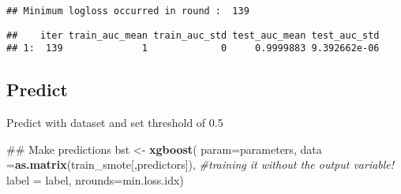\documentclass[11pt,]{article}
\newenvironment{Shaded}{\begin{snugshade}}{\end{snugshade}}
\newcommand{\KeywordTok}[1]{\textcolor[rgb]{0.13,0.29,0.53}{\textbf{#1}}}
\newcommand{\DataTypeTok}[1]{\textcolor[rgb]{0.13,0.29,0.53}{#1}}
\newcommand{\CharTok}[1]{\textcolor[rgb]{0.31,0.60,0.02}{#1}}
\newcommand{\StringTok}[1]{\textcolor[rgb]{0.31,0.60,0.02}{#1}}
\newcommand{\CommentTok}[1]{\textcolor[rgb]{0.56,0.35,0.01}{\textit{#1}}}
\newcommand{\OperatorTok}[1]{\textcolor[rgb]{0.81,0.36,0.00}{\textbf{#1}}}
\newcommand{\NormalTok}[1]{#1}
\begin{document}
\begin{Shaded}
\end{Shaded}

\begin{verbatim}
## Minimum logloss occurred in round :  139
\end{verbatim}

\begin{Shaded}
\end{Shaded}

\begin{verbatim}
##    iter train_auc_mean train_auc_std test_auc_mean test_auc_std
## 1:  139              1             0     0.9999883 9.392662e-06
\end{verbatim}

\subsection{Predict}\label{predict}

Predict with dataset and set threshold of 0.5

\begin{Shaded}
\begin{Highlighting}[]
\NormalTok{## Make predictions}
\NormalTok{bst <-}\StringTok{ }\KeywordTok{xgboost}\NormalTok{(}
  \DataTypeTok{param=}\NormalTok{parameters,}
  \DataTypeTok{data =}\KeywordTok{as.matrix}\NormalTok{(train_smote[,predictors]), }\CommentTok{#training it without the output variable! }
  \DataTypeTok{label =}\NormalTok{ label,}
  \DataTypeTok{nrounds=}\NormalTok{min.loss.idx)}
\end{Highlighting}
\end{Shaded}
\end{document}

